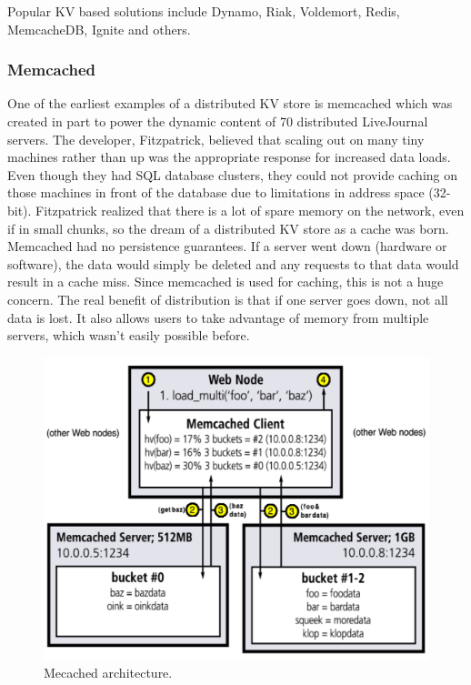 \documentclass[]{article}
\begin{document}
Popular KV based solutions include Dynamo, Riak, Voldemort, Redis, MemcacheDB, Ignite and others.

\subsubsection{Memcached}
One of the earliest examples of a distributed KV store is memcached\cite{fitzpatrick_distributed_2004} which was created in part to power the dynamic content of 70 distributed LiveJournal servers. The developer, Fitzpatrick, believed that scaling out on many tiny machines rather than up was the appropriate response for increased data loads. Even though they had SQL database clusters, they could not provide caching on those machines in front of the database due to limitations in address space (32-bit). Fitzpatrick realized that there is a lot of spare memory on the network, even if in small chunks, so the dream of a distributed KV store as a cache was born. Memcached had no persistence guarantees. If a server went down (hardware or software), the data would simply be deleted and any requests to that data would result in a cache miss. Since memcached is used for caching, this is not a huge concern. The real benefit of distribution is that if one server goes down, not all data is lost. It also allows users to take advantage of memory from multiple servers, which wasn't easily possible before.

\begin{figure}
    \centering
    \includegraphics[width=1.0\linewidth]{img/memcached}
    \caption[Mecached architecture.]{Mecached architecture. \cite{fitzpatrick_distributed_2004}}
    \label{fig:memcached}
\end{figure}
\end{document}
